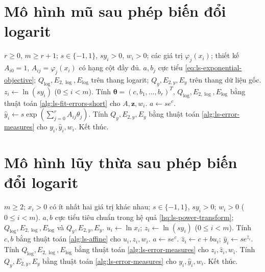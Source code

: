 \documentclass[12pt,a4paper,oneside]{book}
\numberwithin{algorithm}{chapter}
\theoremstyle{definition}
\begin{document}
\section{Mô hình mũ sau phép biến đổi logarit}
\begin{algorithm}[H]
\caption{Khớp $a\exp(\sum_{j=1}^rb_j\varphi_j(x))$ trên thang logarit}
\label{alg:ls-exponential-transform}
\begin{algorithmic}[1]
\Require $r\geq0$, $m\geq r+1$; $s\in\{-1,1\}$, $sy_i>0$, $w_i>0$; các giá trị $\varphi_j(x_i)$; thiết kế $A_{i0}=1$, $A_{ij}=\varphi_j(x_i)$ có hạng cột đầy đủ.
\Ensure $a,b_j$ cực tiểu \eqref{eq:ls-exponential-objective}; $Q_{\log},E_{2,\log},E_{\log}$ trên thang logarit; $Q_y,E_{2,y},E_y$ trên thang dữ liệu gốc.
\State $z_i\gets\ln(sy_i)$ ($0\leq i<m$).
\State Tính $\boldsymbol\theta=(c,b_1,\ldots,b_r)^T$, $Q_{\log},E_{2,\log},E_{\log}$ bằng thuật toán \ref{alg:ls-fit-errors-short} cho $A,\boldsymbol z,w_i$.
\State $a\gets s e^c$.
 \State $\widehat y_i\gets s\exp(\sum_{j=0}^rA_{ij}\theta_j)$.
\EndFor
\Statex
\State Tính $Q_y,E_{2,y},E_y$ bằng thuật toán \ref{alg:ls-error-measures} cho $y_i,\widehat y_i,w_i$.
\State Kết thúc.
\end{algorithmic}
\end{algorithm}

\section{Mô hình lũy thừa sau phép biến đổi logarit}
\begin{algorithm}[H]
\caption{Khớp $ax^b$ trên thang logarit}
\label{alg:ls-power-transform}
\begin{algorithmic}[1]
\Require $m\geq2$; $x_i>0$ có ít nhất hai giá trị khác nhau; $s\in\{-1,1\}$, $sy_i>0$; $w_i>0$ ($0\leq i<m$).
\Ensure $a,b$ cực tiểu tiêu chuẩn trong hệ quả \ref{hq:ls-power-transform}; $Q_{\log},E_{2,\log},E_{\log}$ và $Q_y,E_{2,y},E_y$.
\State $u_i\gets\ln x_i$; $z_i\gets\ln(sy_i)$ ($0\leq i<m$).
\State Tính $c,b$ bằng thuật toán \ref{alg:ls-affine} cho $u_i,z_i,w_i$.
\State $a\gets s e^c$.
 \State $\widehat z_i\gets c+bu_i$; $\widehat y_i\gets s e^{\widehat z_i}$.
\EndFor
\Statex
\State Tính $Q_{\log},E_{2,\log},E_{\log}$ bằng thuật toán \ref{alg:ls-error-measures} cho $z_i,\widehat z_i,w_i$.
\State Tính $Q_y,E_{2,y},E_y$ bằng thuật toán \ref{alg:ls-error-measures} cho $y_i,\widehat y_i,w_i$.
\State Kết thúc.
\end{algorithmic}
\end{algorithm}
\end{document}
